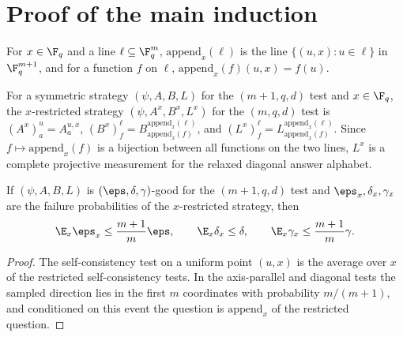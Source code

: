 \section{Proof of the main induction}
\label{sec:proof-of-main-induction}

\begin{definition}\label{def:append-coordinate}
	\leanok
	For $x\in\F_q$ and a line $\ell\subseteq\F_q^m$, $\mathrm{append}_x(\ell)$
	is the line $\{(u,x):u\in\ell\}$ in $\F_q^{m+1}$, and for a function $f$
	on $\ell$, $\mathrm{append}_x(f)(u,x)=f(u)$.
\end{definition}

\begin{definition}\label{def:restricted-strategy}
	\leanok
	For a symmetric strategy $(\psi,A,B,L)$ for the $(m+1,q,d)$ test and
	$x\in\F_q$, the $x$-restricted strategy $(\psi,A^x,B^x,L^x)$ for the
	$(m,q,d)$ test is $(A^x)^u_a=A^{u,x}_a$,
	$(B^x)^\ell_f=B^{\mathrm{append}_x(\ell)}_{\mathrm{append}_x(f)}$, and
	$(L^x)^\ell_f=L^{\mathrm{append}_x(\ell)}_{\mathrm{append}_x(f)}$.  Since
	$f\mapsto\mathrm{append}_x(f)$ is a bijection between all functions on
	the two lines, $L^x$ is a complete projective measurement for the relaxed
	diagonal answer alphabet.
\end{definition}

\begin{lemma}\label{lem:restricted-probabilities}
	\leanok
	If $(\psi,A,B,L)$ is $(\eps,\delta,\gamma)$-good for the $(m+1,q,d)$ test
	and $\eps_x,\delta_x,\gamma_x$ are the failure probabilities of the
	$x$-restricted strategy, then
	\[
		\E_x\eps_x\le\frac{m+1}m\eps,\qquad\E_x\delta_x\le\delta,\qquad
		\E_x\gamma_x\le\frac{m+1}m\gamma.
	\]
\end{lemma}
\begin{proof}
	\leanok
	The self-consistency test on a uniform point $(u,x)$ is the average over
	$x$ of the restricted self-consistency tests.  In the axis-parallel and
	diagonal tests the sampled direction lies in the first $m$ coordinates
	with probability $m/(m+1)$, and conditioned on this event the question is
	$\mathrm{append}_x$ of the restricted question.
\end{proof}

